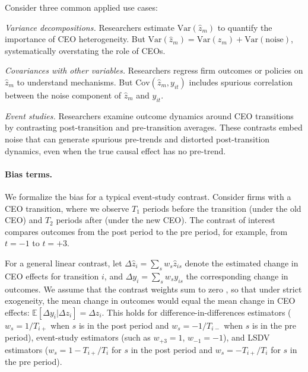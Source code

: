 \documentclass[11pt,a4paper]{article}
\newcommand{\Var}{\text{Var}}
\newcommand{\Cov}{\text{Cov}}
\begin{document}
Consider three common applied use cases:

\textit{Variance decompositions.} Researchers estimate $\Var(\hat z_m)$ to quantify the importance of CEO heterogeneity. But $\Var(\hat z_m) = \Var(z_m) + \Var(\text{noise})$, systematically overstating the role of CEOs.

\textit{Covariances with other variables.} Researchers regress firm outcomes or policies on $\hat z_m$ to understand mechanisms. But $\Cov(\hat z_m, y_{it})$ includes spurious correlation between the noise component of $\hat z_m$ and $y_{it}$.

\textit{Event studies.} Researchers examine outcome dynamics around CEO transitions by contrasting post-transition and pre-transition averages. These contrasts embed noise that can generate spurious pre-trends and distorted post-transition dynamics, even when the true causal effect has no pre-trend.

\paragraph{Bias terms.} We formalize the bias for a typical event-study contrast. Consider firms with a CEO transition, where we observe $T_1$ periods before the transition (under the old CEO) and $T_2$ periods after (under the new CEO). The contrast of interest compares outcomes from the post period to the pre period, for example, from $t=-1$ to $t=+3$. 

For a general linear contrast, let $\Delta \hat z_i = \sum_s w_s \hat z_{is}$ denote the estimated change in CEO effects for transition $i$, and $\Delta y_i = \sum_s w_s y_{is}$ the corresponding change in outcomes. We assume that the contrast weights sum to zero , so that under strict exogeneity, the mean change in outcomes would equal the mean change in CEO effects: $\mathbb E[\Delta y_i|\Delta z_i] = \Delta z_i$. This holds for difference-in-differences estimators ($w_s = 1/T_{i+}$ when $s$ is in the post period and $w_s = -1/T_{i-}$ when $s$ is in the pre period), event-study estimators (such as $w_{+3}=1$, $w_{-1}=-1$), and LSDV estimators ($w_s = 1-T_{i+}/T_i$ for $s$ in the post period and $w_s = -T_{i+}/T_i$ for $s$ in the pre period).
\end{document}
